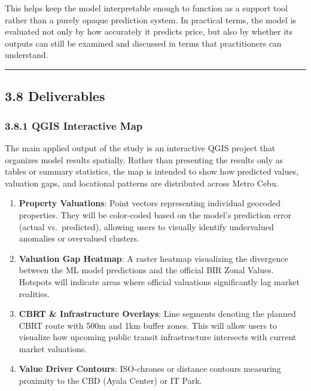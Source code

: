 This helps keep the model interpretable enough to function as a support tool rather than a purely opaque prediction system. In practical terms, the model is evaluated not only by how accurately it predicts price, but also by whether its outputs can still be examined and discussed in terms that practitioners can understand.

\begin{center}\rule{0.5\linewidth}{0.5pt}\end{center}

\subsection{\texorpdfstring{\textbf{3.8 Deliverables}}{3.8 Deliverables}}\label{deliverables}

\subsubsection{\texorpdfstring{\textbf{3.8.1 QGIS Interactive Map}}{3.8.1 QGIS Interactive Map}}\label{qgis-interactive-map}

The main applied output of the study is an interactive QGIS project that organizes model results spatially. Rather than presenting the results only as tables or summary statistics, the map is intended to show how predicted values, valuation gaps, and locational patterns are distributed across Metro Cebu.

\begin{enumerate}
\item \textbf{Property Valuations}: Point vectors representing individual geocoded properties. They will be color-coded based on the model's prediction error (actual vs.~predicted), allowing users to visually identify undervalued anomalies or overvalued clusters.
\item \textbf{Valuation Gap Heatmap}: A raster heatmap visualizing the divergence between the ML model predictions and the official BIR Zonal Values. Hotspots will indicate areas where official valuations significantly lag market realities.
\item \textbf{CBRT \& Infrastructure Overlays}: Line segments denoting the planned CBRT route with 500m and 1km buffer zones. This will allow users to visualize how upcoming public transit infrastructure intersects with current market valuations.
\item \textbf{Value Driver Contours}: ISO-chrones or distance contours measuring proximity to the CBD (Ayala Center) or IT Park.
\end{enumerate}

